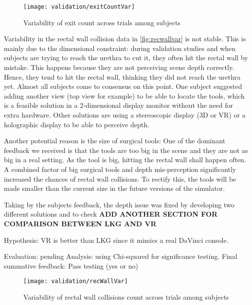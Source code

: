 \begin{figure}
  \centering
  \texttt{[image: validation/exitCountVar]}
  \caption{Variability of exit count across trials among subjects}
  \label{fig:exitvar}
\end{figure}

Variability in the rectal wall collision data in \autoref{fig:recwallvar} is not stable. This is mainly due to the dimensional constraint: during validation studies and when subjects are trying to reach the urethra to cut it, they often hit the rectal wall by mistake. This happens because they are not perceiving scene depth correctly. Hence, they tend to hit the rectal wall, thinking they did not reach the urethra yet. Almost all subjects come to consensus on this point. One subject suggested adding another view (top view for example) to be able to locate the tools, which is a feasible solution in a 2-dimensional display monitor without the need for extra hardware. Other solutions are using a stereoscopic display (3D or VR) or a holographic display to be able to perceive depth.

Another potential reason is the size of surgical tools: One of the dominant feedback we received is that the tools are too big in the scene and they are not as big in a real setting. As the tool is big, hitting the rectal wall shall happen often. A combined factor of big surgical tools and depth mis-perception significantly increased the chances of rectal wall collisions. To rectify this, the tools will be made smaller than the current size in the future versions of the simulator.

Taking by the subjects feedback, the depth issue was fixed by developing two different solutions and to check
\textbf{ADD ANOTHER SECTION FOR COMPARISON BETWEEN LKG AND VR}

Hypothesis: VR is better than LKG since it mimics a real DaVinci console.

Evaluation: pending
Analysis: using Chi-squared for significance testing.
Final summative feedback: Pass testing (yes or no)

\begin{figure}
  \centering
  \texttt{[image: validation/recWallVar]}
  \caption{Variability of rectal wall collisions count across trials among subjects}
  \label{fig:recwallvar}
\end{figure}

